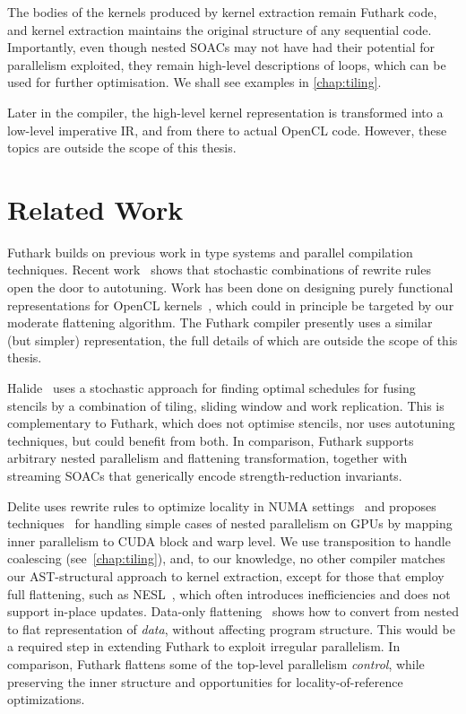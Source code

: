 The bodies of the kernels produced by kernel extraction remain Futhark
code, and kernel extraction maintains the original structure of any
sequential code.  Importantly, even though nested SOACs may not have
had their potential for parallelism exploited, they remain high-level
descriptions of loops, which can be used for further optimisation.  We
shall see examples in \cref{chap:tiling}.

Later in the compiler, the high-level kernel representation is
transformed into a low-level imperative IR, and from there to actual
OpenCL code.  However, these topics are outside the scope of this
thesis.

\section{Related Work}

Futhark builds on previous work in type systems and parallel
compilation techniques. Recent
work~\cite{Steuwer:2015:GPP:2858949.2784754} shows that stochastic
combinations of rewrite rules open the door to autotuning.  Work has
been done on designing purely functional representations for OpenCL
kernels~\cite{Steuwer:2017:LFD:3049832.3049841}, which could in
principle be targeted by our moderate flattening algorithm.  The
Futhark compiler presently uses a similar (but simpler)
representation, the full details of which are outside the scope of
this thesis.

Halide~\cite{Halide} uses a stochastic approach for finding optimal
schedules for fusing stencils by a combination of tiling, sliding
window and work replication.  This is complementary to Futhark, which
does not optimise stencils, nor uses autotuning techniques, but could
benefit from both.  In comparison, Futhark supports arbitrary nested
parallelism and flattening transformation, together with streaming
SOACs that generically encode strength-reduction invariants.

Delite uses rewrite rules to optimize locality in NUMA
settings~\cite{DeliteNUMA} and proposes
techniques~\cite{DeliteNestedPar} for handling simple cases of nested
parallelism on GPUs by mapping inner parallelism to CUDA block and
warp level.  We use transposition to handle coalescing
(see~\cref{chap:tiling}), and, to our knowledge, no other compiler
matches our AST-structural approach to kernel extraction, except for
those that employ full flattening, such as
NESL~\cite{blelloch1994implementation,bergstrom2012nested}, which
often introduces inefficiencies and does not support in-place updates.
%
Data-only flattening~\cite{Bergstrom:2013:DFN:2442516.2442525} shows
how to convert from nested to flat representation of \textit{data},
without affecting program structure.  This would be a required step in
extending Futhark to exploit irregular parallelism.  In comparison,
Futhark flattens some of the top-level parallelism \textit{control},
while preserving the inner structure and opportunities for
locality-of-reference optimizations.

